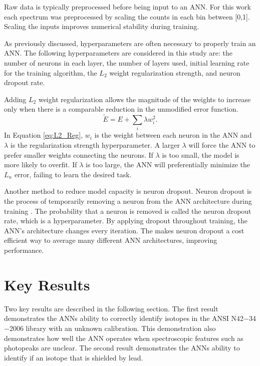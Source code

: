 \documentclass[tocnosub,noragright,centerchapter,12pt,fullpage]{uiucecethesis09}
\begin{document}
Raw data is typically preprocessed before being input to an ANN. For this work each spectrum was preprocessed by scaling the counts in each bin between [0,1]. Scaling the inputs improves numerical stability during training. 

As previously discussed, hyperparameters are often necessary to properly train an ANN. The following hyperparameters are considered in this study are: the number of neurons in each layer, the number of layers used, initial learning rate for the training algorithm, the $L_2$ weight regularization strength, and neuron dropout rate. 

Adding $L_2$ weight regularization allows the magnitude of the weights to increase only when there is a comparable reduction in the unmodified error function.
%
\begin{equation} \label{eq:L2_Reg}
\tilde{E} = E + \sum_i \lambda w_i^2.
\end{equation}
%
In Equation \ref{eq:L2_Reg}, $w_i$ is the weight between each neuron in the ANN and $\lambda$ is the regularization strength hyperparameter. A larger $\lambda$ will force the ANN to prefer smaller weights connecting the neurons. If $\lambda$ is too small, the model is more likely to overfit. If $\lambda$ is too large, the ANN will preferentially minimize the $L_n$ error, failing to learn the desired task.

Another method to reduce model capacity is neuron dropout. Neuron dropout is the process of temporarily removing a neuron from the ANN architecture during training \cite{Srivastava2014}. The probability that a neuron is removed is called the neuron dropout rate, which is a hyperparameter. By applying dropout throughout training, the ANN's architecture changes every iteration. The makes neuron dropout a cost efficient way to average many different ANN architectures, improving performance.



\section{Key Results}

Two key results are described in the following section. The first result demonstrates the ANNs ability to correctly identify isotopes in the ANSI N42$-$34$-$2006 library with an unknown calibration. This demonstration also demonstrates how well the ANN operates when spectroscopic features such as photopeaks are unclear. The second result demonstrates the ANNs ability to identify if an isotope that is shielded by lead.  
\end{document}
